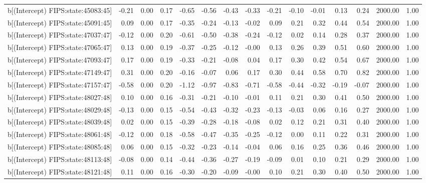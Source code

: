 \begin{table}[ht]
\begin{tabular}{rrrrrrrrrrrrrrr}
  b[(Intercept) FIPS:state:45083:45] & -0.21 & 0.00 & 0.17 & -0.65 & -0.56 & -0.43 & -0.33 & -0.21 & -0.10 & -0.01 & 0.13 & 0.24 & 2000.00 & 1.00 \\ 
  b[(Intercept) FIPS:state:45091:45] & 0.09 & 0.00 & 0.17 & -0.35 & -0.24 & -0.13 & -0.02 & 0.09 & 0.21 & 0.32 & 0.44 & 0.54 & 2000.00 & 1.00 \\ 
  b[(Intercept) FIPS:state:47037:47] & -0.12 & 0.00 & 0.20 & -0.61 & -0.50 & -0.38 & -0.24 & -0.12 & 0.02 & 0.14 & 0.28 & 0.37 & 2000.00 & 1.00 \\ 
  b[(Intercept) FIPS:state:47065:47] & 0.13 & 0.00 & 0.19 & -0.37 & -0.25 & -0.12 & -0.00 & 0.13 & 0.26 & 0.39 & 0.51 & 0.60 & 2000.00 & 1.00 \\ 
  b[(Intercept) FIPS:state:47093:47] & 0.17 & 0.00 & 0.19 & -0.33 & -0.21 & -0.08 & 0.04 & 0.17 & 0.30 & 0.42 & 0.54 & 0.67 & 2000.00 & 1.00 \\ 
  b[(Intercept) FIPS:state:47149:47] & 0.31 & 0.00 & 0.20 & -0.16 & -0.07 & 0.06 & 0.17 & 0.30 & 0.44 & 0.58 & 0.70 & 0.82 & 2000.00 & 1.00 \\ 
  b[(Intercept) FIPS:state:47157:47] & -0.58 & 0.00 & 0.20 & -1.12 & -0.97 & -0.83 & -0.71 & -0.58 & -0.44 & -0.32 & -0.19 & -0.07 & 2000.00 & 1.00 \\ 
  b[(Intercept) FIPS:state:48027:48] & 0.10 & 0.00 & 0.16 & -0.31 & -0.21 & -0.10 & -0.01 & 0.11 & 0.21 & 0.30 & 0.41 & 0.50 & 2000.00 & 1.00 \\ 
  b[(Intercept) FIPS:state:48029:48] & -0.13 & 0.00 & 0.15 & -0.54 & -0.43 & -0.32 & -0.23 & -0.13 & -0.03 & 0.06 & 0.16 & 0.27 & 2000.00 & 1.00 \\ 
  b[(Intercept) FIPS:state:48039:48] & 0.02 & 0.00 & 0.15 & -0.39 & -0.28 & -0.18 & -0.08 & 0.02 & 0.12 & 0.21 & 0.31 & 0.40 & 2000.00 & 1.00 \\ 
  b[(Intercept) FIPS:state:48061:48] & -0.12 & 0.00 & 0.18 & -0.58 & -0.47 & -0.35 & -0.25 & -0.12 & 0.00 & 0.11 & 0.22 & 0.31 & 2000.00 & 1.00 \\ 
  b[(Intercept) FIPS:state:48085:48] & 0.06 & 0.00 & 0.15 & -0.32 & -0.23 & -0.14 & -0.04 & 0.06 & 0.16 & 0.25 & 0.36 & 0.46 & 2000.00 & 1.00 \\ 
  b[(Intercept) FIPS:state:48113:48] & -0.08 & 0.00 & 0.14 & -0.44 & -0.36 & -0.27 & -0.19 & -0.09 & 0.01 & 0.10 & 0.21 & 0.29 & 2000.00 & 1.00 \\ 
  b[(Intercept) FIPS:state:48121:48] & 0.11 & 0.00 & 0.16 & -0.30 & -0.20 & -0.09 & -0.00 & 0.10 & 0.21 & 0.30 & 0.40 & 0.50 & 2000.00 & 1.00 \\ 

\end{tabular}
\end{table}

